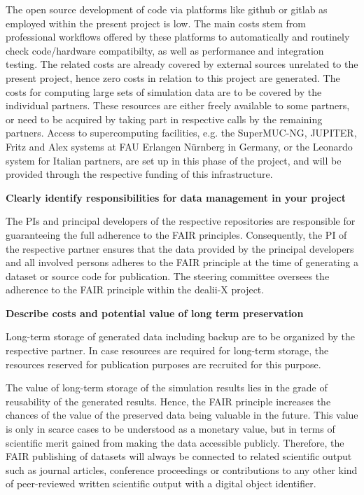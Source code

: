 \documentclass[a4paper,12pt]{article}
\begin{document}
The open source development of code via platforms like github or gitlab as employed within the present project is low. The main costs stem from professional workflows offered by these platforms to automatically and routinely check code/hardware compatibilty, as well as performance and integration testing. The related costs are already covered by external sources unrelated to the present project, hence zero costs in relation to this project are generated. The costs for computing large sets of simulation data are to be covered by the individual partners. These resources are either freely available to some partners, or need to be acquired by taking part in respective calls by the remaining partners. Access to supercomputing facilities, e.g. the SuperMUC-NG, JUPITER, Fritz and Alex systems at FAU Erlangen Nürnberg in Germany, or the Leonardo system for Italian partners, are set up in this phase of the project, and will be provided through the respective funding of this infrastructure.

\noindent \textbf{Clearly identify responsibilities for data management in your project}

The PIs and principal developers of the respective repositories are responsible for guaranteeing the full adherence to the FAIR principles. Consequently, the PI of the respective partner ensures that the data provided by the principal developers and all involved persons adheres to the FAIR principle at the time of generating a dataset or source code for publication. The steering committee oversees the adherence to the FAIR principle within the dealii-X project.

\noindent \textbf{Describe costs and potential value of long term preservation}

Long-term storage of generated data including backup are to be organized by the respective partner. In case resources are required for long-term storage, the resources reserved for publication purposes are recruited for this purpose.

The value of long-term storage of the simulation results lies in the grade of reusability of the generated results. Hence, the FAIR principle increases the chances of the value of the preserved data being valuable in the future. This value is only in scarce cases to be understood as a monetary value, but in terms of scientific merit gained from making the data accessible publicly. Therefore, the FAIR publishing of datasets will always be connected to related scientific output such as journal articles, conference proceedings or contributions to any other kind of peer-reviewed written scientific output with a digital object identifier.  
\end{document}
